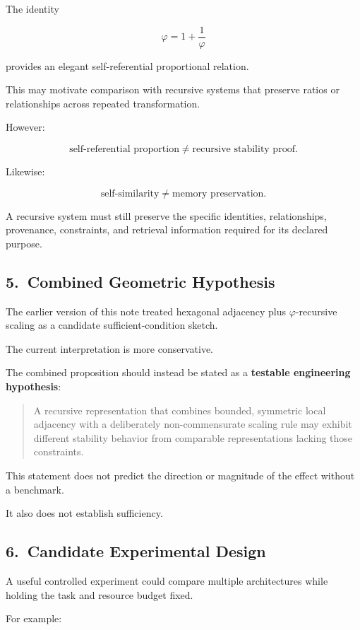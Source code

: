 The identity

\[
\varphi = 1 + \frac{1}{\varphi}
\]

provides an elegant self-referential proportional relation.

This may motivate comparison with recursive systems that preserve ratios or
relationships across repeated transformation.

However:

\[
\text{self-referential proportion}
\neq
\text{recursive stability proof}.
\]

Likewise:

\[
\text{self-similarity}
\neq
\text{memory preservation}.
\]

A recursive system must still preserve the specific identities, relationships,
provenance, constraints, and retrieval information required for its declared
purpose.

\subsection*{5.\ Combined Geometric Hypothesis}

The earlier version of this note treated hexagonal adjacency plus
$\varphi$-recursive scaling as a candidate sufficient-condition sketch.

The current interpretation is more conservative.

The combined proposition should instead be stated as a \textbf{testable
engineering hypothesis}:

\begin{quote}
A recursive representation that combines bounded, symmetric local adjacency
with a deliberately non-commensurate scaling rule may exhibit different
stability behavior from comparable representations lacking those constraints.
\end{quote}

This statement does not predict the direction or magnitude of the effect
without a benchmark.

It also does not establish sufficiency.

\subsection*{6.\ Candidate Experimental Design}

A useful controlled experiment could compare multiple architectures while
holding the task and resource budget fixed.

For example:


